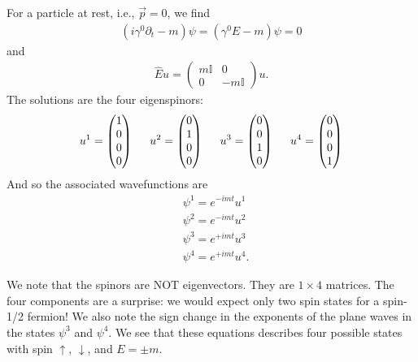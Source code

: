 \documentclass{book}
\theoremstyle{definition}
\newcommand{\p}{\partial}
\newcommand{\nn}{\nonumber}
\newcommand{\lp}{\left(}
\newcommand{\rp}{\right)}
\begin{document}
For a particle at rest, i.e., $\vec{p} = 0$, we find
\begin{align}
\lp i\gamma^0 \p_t - m \rp\psi = (\gamma^0 E - m)\psi = 0
\end{align}
and
\begin{align}
\hat{E}u = \begin{pmatrix}
m \mathbb{I} & 0 \\ 0 & -m\mathbb{I}
\end{pmatrix}u.
\end{align}
The solutions are the four eigenspinors:
\begin{align}
u^1 = \begin{pmatrix}
1 \\0\\0\\0
\end{pmatrix}
\hspace{0.5cm}
u^2 = \begin{pmatrix}
0 \\1\\0\\0
\end{pmatrix}
\hspace{0.5cm}
u^3 = \begin{pmatrix}
0\\0\\1\\0
\end{pmatrix}
\hspace{0.5cm}
u^4 = \begin{pmatrix}
0\\0\\0\\1
\end{pmatrix}
\end{align}
And so the associated wavefunctions are
\begin{align}
&\psi^1 = e^{-imt}u^1 \nn\\
&\psi^2 = e^{-imt}u^2 \nn\\
&\psi^3 = e^{+imt}u^3 \nn\\
&\psi^4 = e^{+imt}u^4 .
\end{align}

We note that the spinors are NOT eigenvectors. They are $1\times 4$ matrices. The four components are a surprise: we would expect only two spin states for a spin-1/2 fermion! We also note the sign change in the exponents of the plane waves in the states $\psi^3$ and $\psi^4$. We see that these equations describes four possible states with spin $\uparrow$, $\downarrow$, and $E =\pm m$. \\
\end{document}
